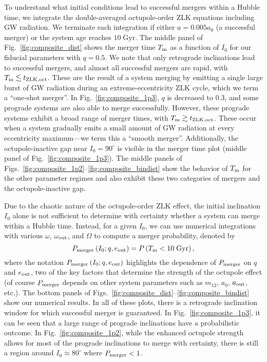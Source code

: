 \documentclass[
        fleqn,
        usenatbib,
    ]{mnras}
\newcommand*{\p}[1]{\left(#1\right)}
\begin{document}
To understand what initial conditions lead to successful mergers within a Hubble
time, we integrate the double-averaged octupole-order ZLK equations including GW
radiation. We terminate each integration if either $a = 0.005a_0$ (a successful
merger) or the system age reaches $10\;\mathrm{Gyr}$. The middle panel of
Fig.~\ref{fig:composite_dist} shows the merger time $T_{\rm m}$ as a function of
$I_0$ for our fiducial parameters with $q = 0.5$. We note that only retrograde
inclinations lead to successful mergers, and almost all successful mergers are
rapid, with $T_{\rm m} \lesssim t_{\rm ZLK, oct}$. These are the result of a
system merging by emitting a single large burst of GW radiation during an
extreme-eccentricity ZLK cycle, which we term a ``one-shot merger''. In
Fig.~\ref{fig:composite_1p3}, $q$ is decreased to $0.3$, and some prograde
systems are also able to merge successfully. However, these prograde systems
exhibit a broad range of merger times, with $T_{\rm m} \gtrsim t_{\rm ZLK,
oct}$. These occur when a system gradually emits a small amount of GW radiation
at every eccentricity maximum---we term this a ``smooth merger''. Additionally,
the octupole-inactive gap near $I_0 = 90^\circ$ is visible in the merger time
plot (middle panel of Fig.~\ref{fig:composite_1p3}). The middle panels of
Figs.~\ref{fig:composite_1p2}--\ref{fig:composite_bindist} show the behavior of
$T_{\rm m}$ for the other parameter regimes and also exhibit these two
categories of mergers and the octupole-inactive gap.

Due to the chaotic nature of the octupole-order ZLK effect, the initial
inclination $I_0$ alone is not sufficient to determine with certainty whether a
system can merge within a Hubble time. Instead, for a given $I_0$, we can use
numerical integrations with various $\omega$, $\omega_{\rm out}$, and $\Omega$
to compute a merger probability, denoted by
\begin{equation}
    P_{\rm merger}\p{I_0; q, e_{\rm out}} = P\p{T_{\rm m} < 10\;\mathrm{Gyr}},
        \label{eq:def_pmerge}
\end{equation}
where the notation $P_{\rm merger}\p{I_0; q, e_{\rm out}}$ highlights the
dependence of $P_{\rm merger}$ on $q$ and $e_{\rm out}$, two of the key factors
that determine the strength of the octupole effect (of course $P_{\rm merger}$
depends on other system parameters such as $m_12$, $a_0$, $a_{\rm out}$, etc.).
The bottom panels of Figs.~\ref{fig:composite_dist}--\ref{fig:composite_bindist}
show our numerical results. In all of these plots, there is a retrograde
inclination window for which successful merger is guaranteed. In
Fig.~\ref{fig:composite_1p3}, it can be seen that a large range of prograde
inclinations have a probabilistic outcome. In Fig.~\ref{fig:composite_1p2},
while the enhanced octupole strength allows for most of the prograde
inclinations to merge with certainty, there is still a region around $I_0
\approx 80^\circ$ where $P_{\rm merger} < 1$.
\end{document}

